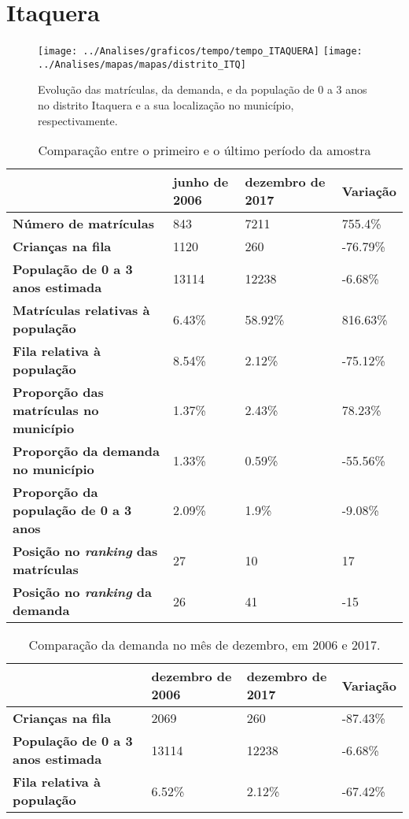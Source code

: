 \section{Itaquera}
\begin{figure}[H]
	\centering
	\texttt{[image: ../Analises/graficos/tempo/tempo\_ITAQUERA]}
	\texttt{[image: ../Analises/mapas/mapas/distrito\_ITQ]}
	\caption{Evolução das matrículas, da demanda, e da população de 0 a 3 anos no distrito Itaquera e a sua localização no município, respectivamente.}
\end{figure}
\begin{table}[H]
	\begin{tabular}{|l|l|l|l|}
		\hline
		\textbf{}                                      & \textbf{junho de 2006}       & \textbf{dezembro de 2017}    & \textbf{Variação} \\ \hline
		\textbf{Número de matrículas}                  & 843 & 7211 & 755.4\% \\ \hline
		\textbf{Crianças na fila}                      & 1120 & 260 & -76.79\% \\ \hline
		\textbf{População de 0 a 3 anos estimada}      & 13114 & 12238 & -6.68\% \\ \hline
		\textbf{Matrículas relativas à população}      & 6.43\% & 58.92\% & 816.63\% \\ \hline
		\textbf{Fila relativa à população}             & 8.54\% & 2.12\% & -75.12\% \\ \hline
		\textbf{Proporção das matrículas no município} & 1.37\% & 2.43\% & 78.23\% \\ \hline
		\textbf{Proporção da demanda no município}     & 1.33\% & 0.59\% & -55.56\% \\ \hline
		\textbf{Proporção da população de 0 a 3 anos}  & 2.09\% & 1.9\% & -9.08\% \\ \hline
		\textbf{Posição no \textit{ranking} das matrículas}     & 27 & 10 & 17 \\ \hline
		\textbf{Posição no \textit{ranking} da demanda}         & 26 & 41 & -15 \\ \hline
	\end{tabular}
	\caption{Comparação entre o primeiro e o último período da amostra}
\end{table}
\begin{table}[H]
	\begin{tabular}{|l|l|l|l|}
		\hline
		\textbf{}                                 & \textbf{dezembro de 2006} & \textbf{dezembro de 2017} & \textbf{Variação} \\ \hline
		\textbf{Crianças na fila}                      & 2069 & 260 & -87.43\% \\ \hline
		\textbf{População de 0 a 3 anos estimada}      & 13114 & 12238 & -6.68\% \\ \hline
		\textbf{Fila relativa à população}             & 6.52\% & 2.12\% & -67.42\% \\ \hline
	\end{tabular}
	\caption{Comparação da demanda no mês de dezembro, em 2006 e 2017.}
\end{table}
